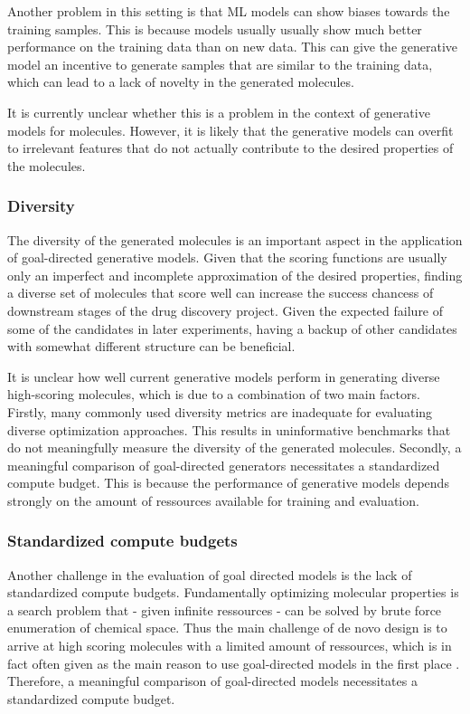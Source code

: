 Another problem in this setting is that \ac{ML} models can show biases towards the training samples.
This is because models usually usually show much better performance on the training data than on new
data. This can give the generative model an incentive to generate samples that are similar to the
training data, which can lead to a lack of novelty in the generated molecules.

It is currently unclear whether this is a problem in the context of generative models for molecules.
However, it is likely that the generative models can overfit to irrelevant features that do not
actually contribute to the desired properties of the molecules.

\subsubsection{Diversity}
The diversity of the generated molecules is an important aspect in the application of goal-directed
generative models. Given that the scoring functions are usually only an imperfect and incomplete
approximation of the desired properties, finding a diverse set of molecules that score well can
increase the success chancess of downstream stages of the drug discovery project. Given the expected
failure of some of the candidates in later experiments, having a backup of other candidates with
somewhat different structure can be beneficial.

It is unclear how well current generative models perform in generating diverse high-scoring
molecules, which is due to a combination of two main factors. Firstly, many commonly used diversity
metrics are inadequate for evaluating diverse optimization approaches. This results in uninformative
benchmarks that do not meaningfully measure the diversity of the generated molecules. Secondly, a
meaningful comparison of goal-directed generators necessitates a standardized compute budget. This
is because the performance of generative models depends strongly on the amount of ressources
available for training and evaluation.

\subsubsection{Standardized compute budgets}
Another challenge in the evaluation of goal directed models is the lack of standardized compute
budgets. Fundamentally optimizing molecular properties is a search problem that - given infinite
ressources - can be solved by brute force enumeration of chemical space. Thus the main challenge of
de novo design is to arrive at high scoring molecules with a limited amount of ressources, which is
in fact often given as the main reason to use goal-directed models in the first place \citep{todo}.
Therefore, a meaningful comparison of goal-directed models necessitates a standardized compute
budget.


